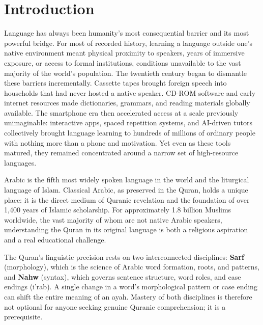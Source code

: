 \documentclass[A4paper,12pt]{article}
\begin{document}
\newpage

\section{Introduction}

Language has always been humanity's most consequential barrier and its most powerful bridge. For most of recorded history, learning a language outside one's native environment meant physical proximity to speakers, years of immersive exposure, or access to formal institutions, conditions unavailable to the vast majority of the world's population. The twentieth century began to dismantle these barriers incrementally. Cassette tapes brought foreign speech into households that had never hosted a native speaker. CD-ROM software and early internet resources made dictionaries, grammars, and reading materials globally available. The smartphone era then accelerated access at a scale previously unimaginable: interactive apps, spaced repetition systems, and AI-driven tutors collectively brought language learning to hundreds of millions of ordinary people with nothing more than a phone and motivation. Yet even as these tools matured, they remained concentrated around a narrow set of high-resource languages.

Arabic is the fifth most widely spoken language in the world and the liturgical language of Islam.
Classical Arabic, as preserved in the Quran, holds a unique place: it is the direct medium of Quranic
revelation and the foundation of over 1,400 years of Islamic scholarship. For approximately 1.8 billion
Muslims worldwide, the vast majority of whom are not native Arabic speakers, understanding the Quran
in its original language is both a religious aspiration and a real educational challenge.

The Quran's linguistic precision rests on two interconnected disciplines: \textbf{Sarf} (morphology),
which is the science of Arabic word formation, roots, and patterns, and \textbf{Nahw} (syntax), which
governs sentence structure, word roles, and case endings (i'rab). A single change in a word's
morphological pattern or case ending can shift the entire meaning of an ayah. Mastery of both
disciplines is therefore not optional for anyone seeking genuine Quranic comprehension; it is a
prerequisite.
\end{document}
